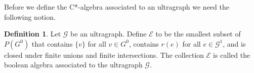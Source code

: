 \documentclass[12pt, reqno]{amsart}
\newtheorem{lemma}[theorem]{Lemma}
\theoremstyle{definition}
\newtheorem{definition}[theorem]{Definition}
\newtheorem{example}[theorem]{Example}
\theoremstyle{remark}
\numberwithin{equation}{section}
\newcommand{\G}{\mathcal{G}}
\newcommand {\N}{\mathbb{N}}
\begin{document}


Before we define the C*-algebra associated to an ultragraph we need the following notion.

\begin{definition}\label{def of mathcal{G}^0}
Let $\mathcal{G}$ be an ultragraph. Define $\mathcal{E}$ to be the smallest subset of $P(G^0)$ that contains $\{v\}$ for all $v\in G^0$, contains $r(e)$ for all $e\in \mathcal{G}^1$, and is closed under finite unions and finite intersections. The collection $\mathcal{E}$ is called the boolean algebra associated to the ultragraph $\G$.
\end{definition}


\end{document}
